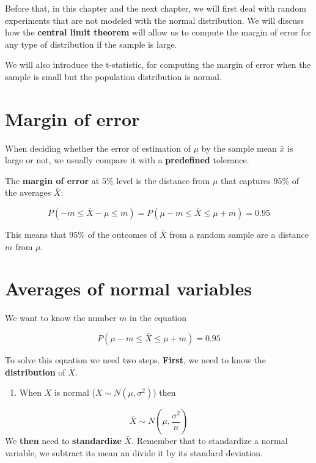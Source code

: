 \documentclass[
]{book}
\providecommand{\tightlist}{%
  \setlength{\itemsep}{0pt}\setlength{\parskip}{0pt}}
\begin{document}
Before that, in this chapter and the next chapter, we will first deal with random experiments that are not modeled with the normal distribution. We will discuss how the \textbf{central limit theorem} will allow us to compute the margin of error for any type of distribution if the sample is large.

We will also introduce the t-statistic, for computing the margin of error when the sample is small but the population distribution is normal.

\hypertarget{margin-of-error}{%
\section{Margin of error}\label{margin-of-error}}

When deciding whether the error of estimation of \(\mu\) by the sample mean \(\bar{x}\) is large or not, we usually compare it with a \textbf{predefined} tolerance.

The \textbf{margin of error} at \(5\%\) level is the distance from \(\mu\) that captures \(95\%\) of the averages \(\bar{X}\):

\[P(-m \leq \bar{X}-\mu \leq m)=P(\mu-m \leq \bar{X} \leq\mu + m)=0.95\]

This means that \(95\%\) of the outcomes of \(\bar{X}\) from a random sample are a distance \(m\) from \(\mu\).

\hypertarget{averages-of-normal-variables}{%
\section{Averages of normal variables}\label{averages-of-normal-variables}}

We want to know the number \(m\) in the equation

\[P(\mu-m \leq \bar{X} \leq\mu + m)=0.95\]

To solve this equation we need two steps. \textbf{First}, we need to know the \textbf{distribution} of \(\bar{X}\).

\begin{enumerate}
\def\labelenumi{\arabic{enumi}.}
\tightlist
\item
  When \(X\) is normal (\(X \sim N(\mu, \sigma^2)\)) then
\end{enumerate}

\[\bar{X} \sim N(\mu, \frac{\sigma^2}{n})\]
We \textbf{then} need to \textbf{standardize} \(\bar{X}\). Remember that to standardize a normal variable, we subtract its mean an divide it by its standard deviation.
\end{document}
